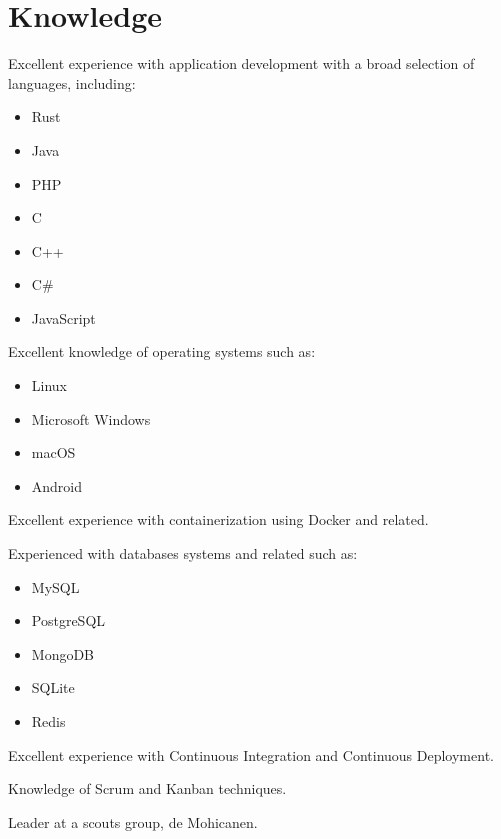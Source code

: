 \documentclass[]{friggeri-cv}
\providecommand{\tightlist}{%
\setlength{\itemsep}{0pt}\setlength{\parskip}{0pt}}
\begin{document}
\section{Knowledge}

Excellent experience with application development with a broad selection of
languages, including:

\begin{multicols}{3}
\begin{itemize}
  \tightlist{}
  \item Rust
  \item Java
  \item PHP
  \item C
  \item C++
  \item C\#
  \item JavaScript
\end{itemize}
\end{multicols}

Excellent knowledge of operating systems such as:

\begin{multicols}{3}
\begin{itemize}
  \tightlist{}
  \item Linux
  \item Microsoft Windows
  \item macOS
  \item Android
\end{itemize}
\end{multicols}

Excellent experience with containerization using Docker and related.

Experienced with databases systems and related such as:

\begin{multicols}{3}
\begin{itemize}
  \tightlist{}
  \item MySQL
  \item PostgreSQL
  \item MongoDB
  \item SQLite
  \item Redis
\end{itemize}
\end{multicols}

Excellent experience with Continuous Integration and Continuous Deployment.

Knowledge of Scrum and Kanban techniques.

Leader at a scouts group, de Mohicanen.
\end{document}
